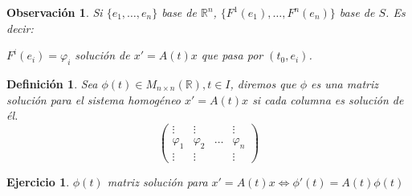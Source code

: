 \documentclass{article}
\theoremstyle{theorem-style}  %
\theoremstyle{definition-style}
\newtheorem{definition}{Definición}[section]
\newtheorem*{observation}{Observación} %
\theoremstyle{example-style}
\newtheorem{exercise}{Ejercicio}[section]
\begin{document}
\begin{observation}
	Si $ \{e_1, \dots, e_n\} $ base de $ \mathbb{R}^n $, $ \{ F^1(e_1), \dots, F^n(e_n) \} $ base de $ S $. Es decir:
	
	$ F^i(e_i)=\varphi_i $ solución de $ x'=A(t)x $ que pasa por $ (t_0, e_i) $.
\end{observation}
\begin{definition}
	Sea $ \phi(t) \in M_{n\times n}(\mathbb{R}), t\in I$, diremos que $ \phi $ es una \emph{matriz solución para el sistema homogéneo} $ x'=A(t)x $ si cada columna es solución de él. 
	\[ \begin{pmatrix}
	\vdots & \vdots  &&\vdots\\
	\varphi_1  & \varphi_2 & \dots&\varphi_n \\
	\vdots & \vdots  &&\vdots
	\end{pmatrix}  \]
\end{definition}
\begin{exercise}
	$ \phi(t) $ matriz solución para $ x'=A(t)x \Leftrightarrow \phi'(t)=A(t)\phi(t) $
\end{exercise}
\end{document}
